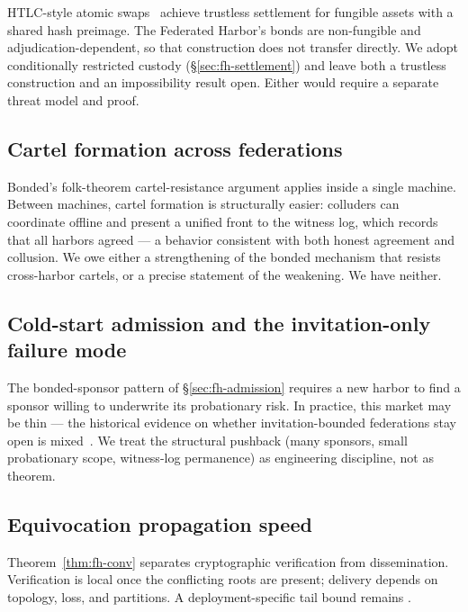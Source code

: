 \documentclass[11pt,a4paper]{article}
\theoremstyle{definition}
\theoremstyle{remark}
\begin{document}
HTLC-style atomic swaps~ achieve trustless settlement for fungible assets with a shared hash preimage. The Federated Harbor's bonds are non-fungible and adjudication-dependent, so that construction does not transfer directly. We adopt conditionally restricted custody (\S\ref{sec:fh-settlement}) and leave both a trustless construction and an impossibility result open. Either would require a separate threat model and proof.

\subsection{Cartel formation across federations}\label{sec:fh-lim-cartel}

Bonded's folk-theorem cartel-resistance argument applies inside a single machine. Between machines, cartel formation is structurally easier: colluders can coordinate offline and present a unified front to the witness log, which records that all harbors agreed --- a behavior consistent with both honest agreement and collusion. We owe either a strengthening of the bonded mechanism that resists cross-harbor cartels, or a precise statement of the weakening. We have neither.

\subsection{Cold-start admission and the invitation-only failure mode}\label{sec:fh-lim-cold-start}

The bonded-sponsor pattern of \S\ref{sec:fh-admission} requires a new harbor to find a sponsor willing to underwrite its probationary risk. In practice, this market may be thin --- the historical evidence on whether invitation-bounded federations stay open is mixed~. We treat the structural pushback (many sponsors, small probationary scope, witness-log permanence) as engineering discipline, not as theorem.

\subsection{Equivocation propagation speed}\label{sec:fh-lim-equiv}

Theorem~\ref{thm:fh-conv} separates cryptographic verification from dissemination.
Verification is local once the conflicting roots are present; delivery depends on
topology, loss, and partitions. A deployment-specific tail bound remains \Open.
\end{document}
